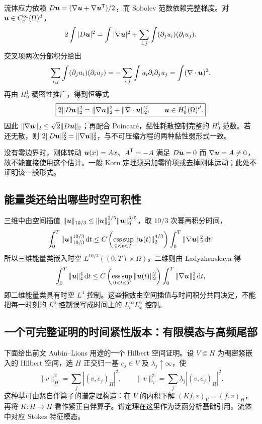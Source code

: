 流体应力依赖 $D\bm{u}=(\nabla\bm{u}+\nabla\bm{u}^{\mathsf T})/2$，而 Sobolev 范数依赖完整梯度。对 $\bm{u}\in C_c^\infty(\Omega)^d$，
\[
 2\int|D\bm{u}|^2
 =\int|\nabla\bm{u}|^2+
   \sum_{i,j}\int(\partial_j u_i)(\partial_i u_j).
\]
交叉项两次分部积分给出
\[
 \sum_{i,j}\int(\partial_j u_i)(\partial_i u_j)
 =-\sum_{i,j}\int u_i\partial_i\partial_j u_j
 =\int(\nabla\cdot\bm{u})^2.
\]
再由 $H^1_0$ 稠密性推广，得到恒等式
\begin{equation}
 \boxed{2\|D\bm{u}\|_2^2=\|\nabla\bm{u}\|_2^2
                +\|\nabla\cdot\bm{u}\|_2^2,
       \qquad\bm{u}\in H^1_0(\Omega)^d.}
 \label{eq:sobolev-korn-zero}
\end{equation}
因此 $\|\nabla\bm{u}\|_2\le\sqrt2\|D\bm{u}\|_2$；再配合 Poincar\'e，黏性耗散控制完整的 $H^1_0$ 范数。若还无散，则 $2\|D\bm{u}\|_2^2=\|\nabla\bm{u}\|_2^2$，与不可压缩方程的两种黏性弱形式一致。

没有零边界时，刚体转动 $\bm{u}(x)=Ax$、$A^{\mathsf T}=-A$ 满足 $D\bm{u}=0$ 而 $\nabla\bm{u}=A\ne0$，故不能直接使用这个估计。一般 Korn 定理须另加零阶项或去掉刚体运动；此处不证明该一般形式。

\subsection{能量类还给出哪些时空可积性}

三维中由空间插值
$\|\bm{u}\|_{10/3}\le\|\bm{u}\|_2^{2/5}\|\bm{u}\|_6^{3/5}$，取 $10/3$ 次幂再积分时间，
\begin{equation}
 \int_0^T\|\bm{u}\|_{10/3}^{10/3}\,\mathrm d t
 \le C\left(\operatorname*{ess\,sup}_{0<t<T}\|\bm{u}(t)\|_2^{4/3}\right)
       \int_0^T\|\nabla\bm{u}\|_2^2\,\mathrm d t.
 \label{eq:sobolev-spacetime-3d}
\end{equation}
所以三维能量类嵌入时空 $L^{10/3}((0,T)\times\Omega)$。二维则由 Ladyzhenskaya 得
\[
 \int_0^T\|\bm{u}\|_4^4\,\mathrm d t
 \le C\left(\operatorname*{ess\,sup}_{0<t<T}\|\bm{u}(t)\|_2^2\right)
       \int_0^T\|\nabla\bm{u}\|_2^2\,\mathrm d t,
\]
即二维能量类具有时空 $L^4$ 控制。这些指数由空间插值与时间积分共同决定，不能把每一时刻的 $L^6$ 控制误写成时间上的 $L^\infty_tL^6_x$ 控制。

\subsection{一个可完整证明的时间紧性版本：有限模态与高频尾部}\label{subsec:sobolev-time-compact}

下面给出前文 Aubin--Lions 用途的一个 Hilbert 空间证明。设 $V\Subset H$ 为稠密紧嵌入的 Hilbert 空间，选 $H$ 正交归一基 $e_j\in V$ 及 $\lambda_j\uparrow\infty$，使
\[
 \|v\|_H^2=\sum_j|(v,e_j)_H|^2,\qquad
 \|v\|_V^2=\sum_j\lambda_j|(v,e_j)_H|^2.
\]
这种基可由紧自伴算子的谱定理构造：在 $V$ 的内积下解 $(Kf,v)_V=(f,v)_H$，再将 $K:H\to H$ 看作紧正自伴算子。谱定理在这里作为泛函分析基础引用。流体中对应 Stokes 特征模态。

